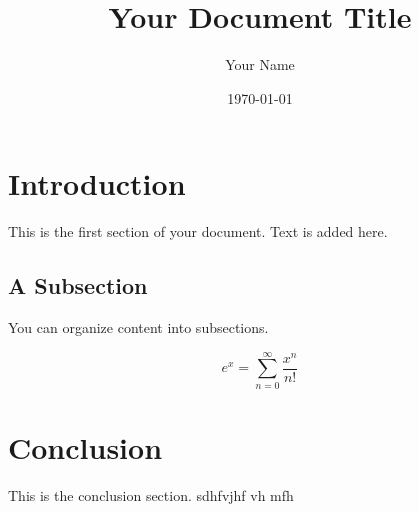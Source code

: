 \documentclass{article}
\title{Your Document Title}
\author{Your Name}
\date{\today}
\begin{document}
\maketitle

\section{Introduction}
This is the first section of your document. Text is added here. 

\subsection{A Subsection}
You can organize content into subsections.

\[
e^x = \sum_{n=0}^{\infty} \frac{x^n}{n!}
\]

\section{Conclusion}
This is the conclusion section.
sdhfvjhf vh
mfh 
\end{document}
